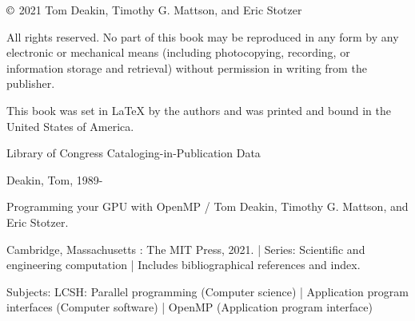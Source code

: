 \newpage
{\footnotesize  %
\raggedright
\thispagestyle{empty}
\noindent
\(\copyright\) 2021 Tom Deakin, Timothy G. Mattson, and Eric Stotzer
 
\vspace{13pt}
\noindent
All rights reserved. No part of this book may be reproduced in any form by any 
electronic or mechanical means (including photocopying, recording, or information 
storage and retrieval) without permission in writing from the publisher.
 
\vspace{13pt}
\noindent
This book was set in {\LaTeX} by the authors and was
printed and bound in the United States of America.


\vspace{13pt}
Library of Congress Cataloging-in-Publication Data

\vspace{13pt}

Deakin, Tom, 1989- 

Programming your GPU with OpenMP / Tom Deakin, Timothy G. 
Mattson, and Eric Stotzer.  
   

Cambridge, Massachusetts : The MIT Press, 2021. | Series: 
Scientific and engineering computation | Includes bibliographical 
references and index. 
   

Subjects: LCSH: Parallel programming (Computer science) | Application 
program interfaces (Computer software) | OpenMP (Application program 
interface) 





\vspace{13pt}
 
\vspace{13pt}
\noindent


}
